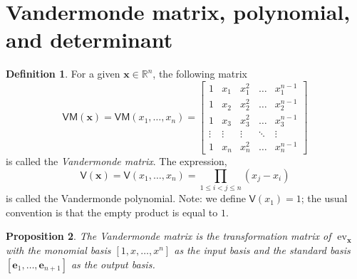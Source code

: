 \documentclass[12pt]{article}
\newtheorem{proposition}{Proposition}
\theoremstyle{definition}
\newtheorem{definition}[proposition]{Definition}
\newcommand{\bmat}[1]{\begin{bmatrix}#1\end{bmatrix}}
\newcommand{\be}{\mathbf{e}}
\newcommand{\bx}{\mathbf{x}}
\newcommand{\ev}{\operatorname{ev}}
\newcommand{\VM}{\mathsf{VM}}
\newcommand{\VD}{\mathsf{V}}
\newcommand{\Rset}{\mathbb{R}}
\begin{document}
\section{Vandermonde matrix, polynomial, and determinant}
\begin{definition}
  For a given $\bx\in \Rset^{n}$, the following matrix
  \[ \VM(\bx) = \VM(x_1,\ldots, x_{n}) = 
  \bmat{
    1 & x_1 & x_1^{2} &\ldots & x_1^{n-1} \\
    1 & x_2 & x_2^{2} &\ldots &x_2^{n-1} \\
    1 & x_{3} & x_{3}^{2} & \ldots & x_{3}^{n-1} \\
    \vdots & \vdots & \vdots & \ddots  & \vdots \\
    1 & x_{n} & x_{n}^{2} & \ldots & x_{n}^{n-1} }
  \] 
  is called
  the \emph{Vandermonde matrix}.  The
  expression,
  \[ \VD(\bx) = \VD(x_1,\ldots, x_{n}) = \prod_{1\leq i< j\leq n}
    (x_j-x_i)\] 
    is called the Vandermonde  polynomial.  Note: we define $\VD(x_1)
    =1$; the usual convention is that the empty product is equal to $1$.
\end{definition}

\begin{proposition}
  The Vandermonde matrix is the transformation matrix of $\ev_{\bx}$ with the
  monomial basis $[1,x,\ldots, x^n]$ as the input basis and the
  standard basis $[\be_1,\ldots,\be_{n+1}]$ as the output basis.
\end{proposition}
\end{document}

